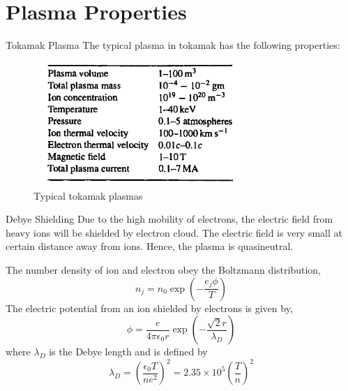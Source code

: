 \section{Plasma Properties}
\begin{frame}{Tokamak Plasma}
    The typical plasma in tokamak has the following properties:
    \begin{figure}
        \includegraphics[width=0.7\textwidth]{figures/tokamak-plasma.png}
        \caption{Typical tokamak plasmas}
        \label{fig:typical-tokamak-plasmas}
    \end{figure}
\end{frame}

\begin{frame}{Debye Shielding}
    Due to the high mobility of electrons, the electric field from heavy ions will be shielded by electron cloud. The electric field is very small at certain distance away from ions. Hence, the plasma is quasineutral.

    The number density of ion and electron obey the Boltzmann distribution,
    \begin{equation}
        n_j = n_0 \exp(-\frac{e_j\phi}{T})
        \label{eq:boltzmann-distribution}
    \end{equation}
    The electric potential from an ion shielded by electrons is given by,
    \begin{equation}
        \phi = \frac{e}{4\pi\epsilon_0r} \exp(-\frac{\sqrt{2}r}{\lambda_D})
        \label{eq:electric-potential}
    \end{equation}
    where $\lambda_D$ is the Debye length and is defined by
    \begin{equation}
        \lambda_D = \left(\frac{\epsilon_0 T}{ne^2}\right)^2 = 2.35\times10^5\left(\frac{T}{n}\right)^2
        \label{eq:bebye-length}
    \end{equation}
\end{frame}

